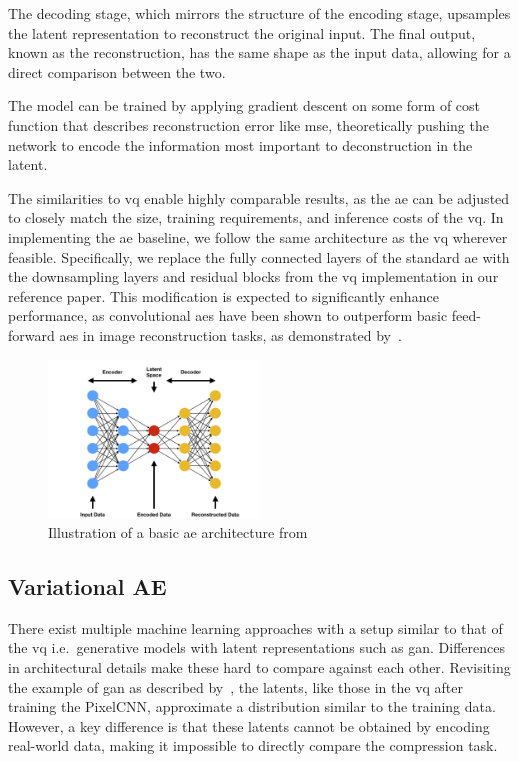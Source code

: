The decoding stage, which mirrors the structure of the encoding stage, upsamples the latent representation to reconstruct the original input.
The final output, known as the reconstruction, has the same shape as the input data, allowing for a direct comparison between the two.

The model can be trained by applying gradient descent on some form of cost function that describes reconstruction error
like \ac{mse}, theoretically pushing the network to encode the information most important to deconstruction in the
latent.

The similarities to \ac{vq} enable highly comparable results, as the \ac{ae} can be adjusted to closely match the
size, training requirements, and inference costs of the \ac{vq}.
In implementing the \ac{ae} baseline, we follow the same architecture as the \ac{vq} wherever feasible.
Specifically, we replace the fully connected layers of the standard \ac{ae} with the downsampling layers and
residual blocks from the \ac{vq} implementation in our reference paper.
This modification is expected to significantly enhance performance, as convolutional \ac{ae}s have been shown to
outperform basic feed-forward \ac{ae}s in image reconstruction tasks, as demonstrated by~\cite{convae}.

\begin{figure}[H]
    \centering
    \includegraphics[width=0.5\textwidth]{images/ae}
    \caption{Illustration of a basic \ac{ae} architecture from~\cite{ae_pic}}
    \label{fig:ae}
\end{figure}

\subsection{Variational AE}\label{subsec:variational-ae}
There exist multiple machine learning approaches with a setup similar to that of the \ac{vq}
i.e.\ generative models with latent representations such as \ac{gan}.
Differences in architectural details make these hard to compare against each other.
Revisiting the example of \ac{gan} as described by~\cite{gan}, the latents, like those in the \ac{vq} after
training the PixelCNN, approximate a distribution similar to the training data.
However, a key difference is that these latents cannot be obtained by encoding real-world data, making it impossible to
directly compare the compression task.

